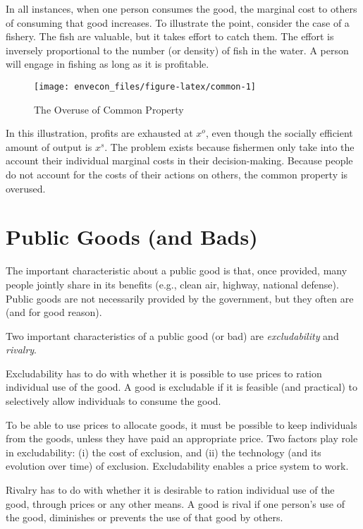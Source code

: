 \documentclass[
]{book}
\begin{document}
In all instances, when one person consumes the good, the marginal cost to others of consuming that good increases. To illustrate the point, consider the case of a fishery. The fish are valuable, but it takes effort to catch them. The effort is inversely proportional to the number (or density) of fish in the water. A person will engage in fishing as long as it is profitable.

\begin{figure}

{\centering \texttt{[image: envecon\_files/figure-latex/common-1]} 

}

\caption{The Overuse of Common Property}\label{fig:common}
\end{figure}

In this illustration, profits are exhausted at \(x^o\), even though the socially efficient amount of output is \(x^s\). The problem exists because fishermen only take into the account their individual marginal costs in their decision-making. Because people do not account for the costs of their actions on others, the common property is overused.

\hypertarget{public-goods-and-bads}{%
\section{Public Goods (and Bads)}\label{public-goods-and-bads}}

The important characteristic about a public good is that, once provided, many people jointly share in its benefits (e.g., clean air, highway, national defense). Public goods are not necessarily provided by the government, but they often are (and for good reason).

Two important characteristics of a public good (or bad) are \emph{excludability} and \emph{rivalry}.

Excludability has to do with whether it is possible to use prices to ration individual use of the good. A good is excludable if it is feasible (and practical) to selectively allow individuals to consume the good.

To be able to use prices to allocate goods, it must be possible to keep individuals from the goods, unless they have paid an appropriate price. Two factors play role in excludability: (i) the cost of exclusion, and (ii) the technology (and its evolution over time) of exclusion. Excludability enables a price system to work.

Rivalry has to do with whether it is desirable to ration individual use of the good, through prices or any other means. A good is rival if one person's use of the good, diminishes or prevents the use of that good by others.
\end{document}

